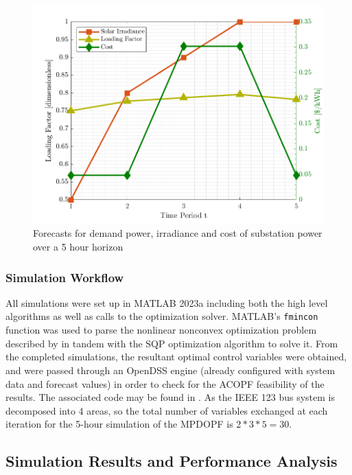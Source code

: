 \begin{figure}[t]
    \centering
    \includegraphics[height=0.25\textheight]{figures/T5-inputCurves/InputCurves_Horizon_5.png}
    \caption{Forecasts for demand power, irradiance and cost of substation power over a 5 hour horizon}
    \label{fig:inputCurve-5}
    \vspace{-4mm}
\end{figure}

\subsubsection{Simulation Workflow}

All simulations were set up in MATLAB 2023a including both the high level algorithms as well as calls to the optimization solver. MATLAB's \texttt{fmincon} function was used to parse the nonlinear nonconvex optimization problem described by  in tandem with the SQP optimization algorithm to solve it. From the completed simulations, the resultant optimal control variables were obtained, and were passed through an OpenDSS engine (already configured with system data and forecast values) in order to check for the ACOPF feasibility of the results. 
The associated code may be found in \cite{MPOPFRepo}. 
As the IEEE 123 bus system is decomposed into 4 areas, so the total number of variables exchanged at each iteration for the 5-hour simulation of the MPDOPF is \(2*3*5=30\).

\subsection{Simulation Results and Performance Analysis}

